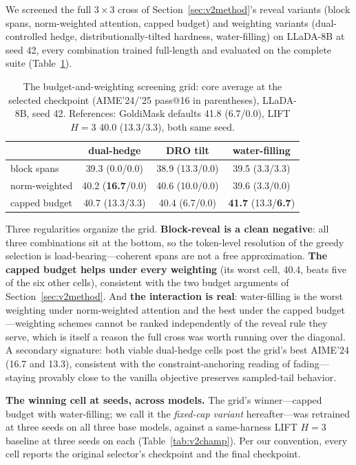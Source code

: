 \documentclass{article} %
\begin{document}
We screened the full $3 \times 3$ cross of Section~\ref{sec:v2method}'s reveal variants (block spans, norm-weighted attention, capped budget) and weighting variants (dual-controlled hedge, distributionally-tilted hardness, water-filling) on LLaDA-8B at seed 42, every combination trained full-length and evaluated on the complete suite (Table~\ref{tab:v2grid}).

\begin{table}[t]
\caption{The budget-and-weighting screening grid: core average at the selected checkpoint (AIME'24/'25 pass@16 in parentheses), LLaDA-8B, seed 42. References: GoldiMask defaults 41.8 (6.7/0.0), LIFT $H{=}3$ 40.0 (13.3/3.3), both same seed.}
\label{tab:v2grid}
\begin{center}
\begin{tabular}{lccc}
\toprule
 & dual-hedge & DRO tilt & water-filling \\
\midrule
block spans    & 39.3 (0.0/0.0)  & 38.9 (13.3/0.0) & 39.5 (3.3/3.3) \\
norm-weighted  & 40.2 (\textbf{16.7}/0.0) & 40.6 (10.0/0.0) & 39.6 (3.3/0.0) \\
capped budget  & 40.7 (13.3/3.3) & 40.4 (6.7/0.0)  & \textbf{41.7} (13.3/\textbf{6.7}) \\
\bottomrule
\end{tabular}
\end{center}
\end{table}

Three regularities organize the grid. \textbf{Block-reveal is a clean negative}: all three combinations sit at the bottom, so the token-level resolution of the greedy selection is load-bearing---coherent spans are not a free approximation. \textbf{The capped budget helps under every weighting} (its worst cell, 40.4, beats five of the six other cells), consistent with the two budget arguments of Section~\ref{sec:v2method}. And \textbf{the interaction is real}: water-filling is the worst weighting under norm-weighted attention and the best under the capped budget---weighting schemes cannot be ranked independently of the reveal rule they serve, which is itself a reason the full cross was worth running over the diagonal. A secondary signature: both viable dual-hedge cells post the grid's best AIME'24 (16.7 and 13.3), consistent with the constraint-anchoring reading of fading---staying provably close to the vanilla objective preserves sampled-tail behavior.

\textbf{The winning cell at seeds, across models.} The grid's winner---capped budget with water-filling; we call it the \emph{fixed-cap variant} hereafter---was retrained at three seeds on all three base models, against a same-harness LIFT $H{=}3$ baseline at three seeds on each (Table~\ref{tab:v2champ}). Per our convention, every cell reports the original selector's checkpoint and the final checkpoint.
\end{document}
